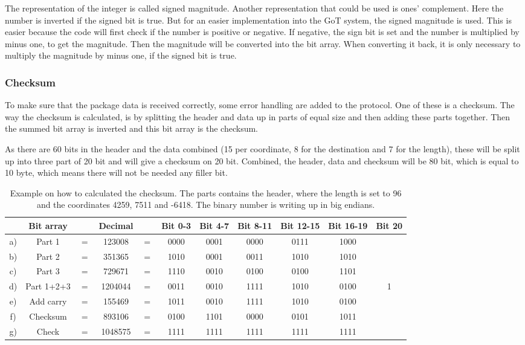 The representation of the integer is called signed magnitude. Another representation that could be used is ones' complement. Here the number is inverted if the signed bit is true. But for an easier implementation into the GoT system, the signed magnitude is used. This is easier because the code will first check if the number is positive or negative. If negative, the sign bit is set and the number is multiplied by minus one, to get the magnitude. Then the magnitude will be converted into the bit array. When converting it back, it is only necessary to multiply the magnitude by minus one, if the signed bit is true.

\subsubsection{Checksum}
To make sure that the package data is received correctly, some error handling are added to the protocol. One of these is a checksum. The way the checksum is calculated, is by splitting the header and data up in parts of equal size and then adding these parts together. Then the summed bit array is inverted and this bit array is the checksum. 

As there are 60 bits in the header and the data combined (15 per coordinate, 8 for the destination and 7 for the length), these will be split up into three part of 20 bit and will give a checksum on 20 bit. Combined, the header, data and checksum will be 80 bit, which is equal to 10 byte, which means there will not be needed any filler bit.

\begin{table}[H]
\centering
\begin{tabular}{c c c c c c c c c c c}
   & Bit array  &     & Decimal &     & Bit 0-3 & Bit 4-7 & Bit 8-11 & Bit 12-15 & Bit 16-19 & Bit 20 \\
\hline
a) & Part 1     & $=$ & 123008  & $=$ & 0000 & 0001 & 0000 & 0111 & 1000 & \\
b) & Part 2     & $=$ & 351365  & $=$ & 1010 & 0001 & 0011 & 1010 & 1010 & \\
c) & Part 3     & $=$ & 729671  & $=$ & 1110 & 0010 & 0100 & 0100 & 1101 & \\
d) & Part 1+2+3 & $=$ & 1204044 & $=$ & 0011 & 0010 & 1111 & 1010 & 0100 & 1 \\
e) & Add carry  & $=$ & 155469  & $=$ & 1011 & 0010 & 1111 & 1010 & 0100 & \\
f) & Checksum   & $=$ & 893106  & $=$ & 0100 & 1101 & 0000 & 0101 & 1011 & \\
g) & Check      & $=$ & 1048575 & $=$ & 1111 & 1111 & 1111 & 1111 & 1111 & \\
\end{tabular}
\caption{Example on how to calculated the checksum. The parts contains the header, where the length is set to 96 and the coordinates 4259, 7511 and -6418. The binary number is writing up in big endians.}
\label{ChecksumExp}
\end{table}

